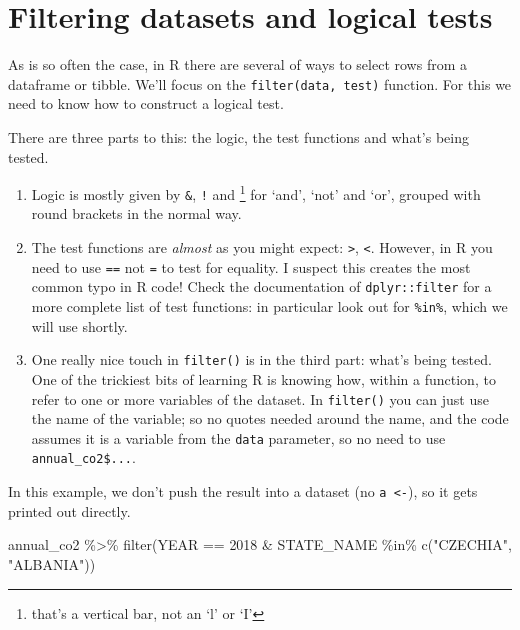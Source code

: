 \documentclass[
]{book}
\newenvironment{Shaded}{\begin{snugshade}}{\end{snugshade}}
\newcommand{\DecValTok}[1]{\textcolor[rgb]{0.00,0.00,0.81}{#1}}
\newcommand{\FunctionTok}[1]{\textcolor[rgb]{0.00,0.00,0.00}{#1}}
\newcommand{\NormalTok}[1]{#1}
\newcommand{\SpecialCharTok}[1]{\textcolor[rgb]{0.00,0.00,0.00}{#1}}
\newcommand{\StringTok}[1]{\textcolor[rgb]{0.31,0.60,0.02}{#1}}
\providecommand{\tightlist}{%
  \setlength{\itemsep}{0pt}\setlength{\parskip}{0pt}}
\begin{document}
\hypertarget{filtering-datasets-and-logical-tests}{%
\section{Filtering datasets and logical tests}\label{filtering-datasets-and-logical-tests}}

As is so often the case, in R there are several of ways to select rows from a dataframe or tibble. We'll focus on the \texttt{filter(data,\ test)} function. For this we need to know how to construct a logical test.

There are three parts to this: the logic, the test functions and what's being tested.

\begin{enumerate}
\def\labelenumi{\arabic{enumi})}
\tightlist
\item
  Logic is mostly given by \texttt{\&}, \texttt{!} and \texttt{\textbar{}}\footnote{that's a vertical bar, not an `l' or `I'} for `and', `not' and `or', grouped with round brackets in the normal way.
\item
  The test functions are \emph{almost} as you might expect: \texttt{\textgreater{}}, \texttt{\textless{}}. However, in R you need to use \texttt{==} not \texttt{=} to test for equality. I suspect this creates the most common typo in R code! Check the documentation of \texttt{dplyr::filter} for a more complete list of test functions: in particular look out for \texttt{\%in\%}, which we will use shortly.
\item
  One really nice touch in \texttt{filter()} is in the third part: what's being tested. One of the trickiest bits of learning R is knowing how, within a function, to refer to one or more variables of the dataset. In \texttt{filter()} you can just use the name of the variable; so no quotes needed around the name, and the code assumes it is a variable from the \texttt{data} parameter, so no need to use \texttt{annual\_co2\$...}.
\end{enumerate}

In this example, we don't push the result into a dataset (no \texttt{a\ \textless{}-}), so it gets printed out directly.

\begin{Shaded}
\begin{Highlighting}[]
\NormalTok{annual\_co2 }\SpecialCharTok{\%\textgreater{}\%} 
  \FunctionTok{filter}\NormalTok{(YEAR }\SpecialCharTok{==} \DecValTok{2018} \SpecialCharTok{\&}\NormalTok{ STATE\_NAME }\SpecialCharTok{\%in\%} \FunctionTok{c}\NormalTok{(}\StringTok{"CZECHIA"}\NormalTok{, }\StringTok{"ALBANIA"}\NormalTok{))}
\end{Highlighting}
\end{Shaded}
\end{document}
